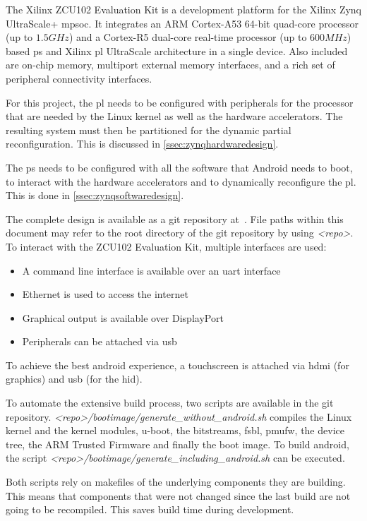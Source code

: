 The Xilinx ZCU102 Evaluation Kit is a development platform for the Xilinx Zynq UltraScale+ \gls{mpsoc}.
It integrates an ARM Cortex-A53 64-bit quad-core processor (up to $1.5 GHz$) and a Cortex-R5 dual-core real-time processor (up to $600 MHz$) based \gls{ps} and Xilinx \gls{pl} UltraScale architecture in a single device. Also included are on-chip memory, multiport external memory interfaces, and a rich set of peripheral connectivity interfaces.

For this project, the \gls{pl} needs to be configured with peripherals for the
processor that are needed by the Linux kernel as well as the hardware
accelerators.
The resulting system must then be partitioned for the dynamic partial
reconfiguration.
This is discussed in \cref{ssec:zynqhardwaredesign}.

The \gls{ps} needs to be configured with all the software that Android needs to
boot, to interact with the hardware accelerators and to dynamically reconfigure
the \gls{pl}.
This is done in \cref{ssec:zynqsoftwaredesign}.

The complete design is available as a git repository at~\cite{repo}.
File paths within this document may refer to the root directory of the git
repository by using \emph{<repo>}.
To interact with the ZCU102 Evaluation Kit, multiple interfaces are used:
\begin{itemize}
	\item A command line interface is available over an \gls{uart} interface
	\item Ethernet is used to access the internet
	\item Graphical output is available over DisplayPort
	\item Peripherals can be attached via \gls{usb}
\end{itemize}

To achieve the best android experience, a touchscreen is attached via \gls{hdmi} (for graphics) and \gls{usb} (for the \gls{hid}).

To automate the extensive build process, two scripts are available in the git
repository.
\emph{<repo>/bootimage/generate\_without\_android.sh} compiles the Linux kernel and the kernel modules, u-boot, the bitstreams, \gls{fsbl}, \gls{pmufw}, the device tree, the ARM Trusted Firmware and finally the boot image. To build android, the script \emph{<repo>/bootimage/generate\_including\_android.sh} can be executed.

Both scripts rely on makefiles of the underlying components they are building. This means that components that were not changed since the last build are not going to be recompiled. This saves build time during development.

